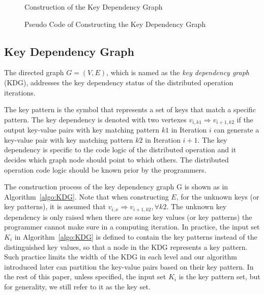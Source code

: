 \documentclass[10pt,journal,compsoc]{IEEEtran}
\makeatletter
\newcommand{\removelatexerror}{\let\@latex@error\@gobble}
\makeatother
\begin{document}
\begin{figure}[!t]
\removelatexerror

\begin{algorithm}[H]


\caption{Construction of the Key Dependency Graph}
\label{algo:KDG}
\end{algorithm}

\caption{Pseudo Code of Constructing the Key Dependency Graph}
\label{fig:KDG}
\end{figure}


\subsection{Key Dependency Graph}\label{section:kdg}

The directed graph $G=(V,E)$, which is named as the \emph{key dependency graph} (KDG), addresses the key dependency status of the distributed operation iterations. 

The key pattern is the symbol that represents a set of keys that match a specific pattern.
The key dependency is denoted with two vertexes $v_{i,k1} \Rightarrow v_{i+1,k2}$ if
the output key-value pairs with key matching pattern $k1$
in Iteration $i$ can generate a key-value pair with key matching pattern $k2$ in Iteration $i+1$.
The key dependency is specific to the code logic of the distributed operation 
and it decides which graph node should point to which others. 
The distributed operation code logic should be known prior by the programmers.

The construction process of the key dependency graph G is shown as in Algorithm~\ref{algo:KDG}.
Note that when constructing $E$, for the unknown keys (or key patterns), it is assumed that $v_{i,x} \Rightarrow v_{i+1,k2}, \forall k2$. 
The unknown key dependency is only raised when there are some key values (or key patterns) the programmer cannot make sure in a computing iteration. 
In practice, the input set $K_i$ in Algorithm~\ref{algo:KDG} is defined to contain the key patterns instead of the distinguished key values, so that a node in the KDG represents a key pattern. 
Such practice limits the width of the KDG in each level
and our algorithm introduced later can partition the key-value pairs based on their key pattern. 
In the rest of this paper, unless specified, the input set $K_i$ is the key pattern set, 
but for generality, we still refer to it as the key set. 
\end{document}
